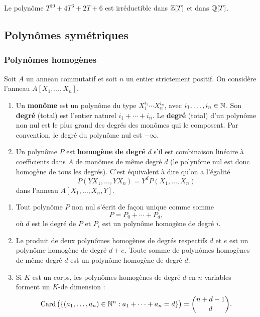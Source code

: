 \documentclass[]{report}
\begin{document}
\begin{ex}{}{}
    Le polynôme $T^{10} + 4T^3 + 2T + 6$ est irréductible dans $\mathbb{Z}[T]$ et dans $\mathbb{Q}[T]$.
\end{ex}

\subsection{Polynômes symétriques}

\subsubsection{Polynômes homogènes}

Soit $A$ un anneau commutatif et soit $n$ un entier strictement positif. On considère l'anneau $A[X_1, \ldots, X_n]$.

\begin{df}{}{}
    \begin{enumerate}
        \item Un \textbf{monôme} est un polynôme du type $X_1^{i_1} \cdots X_n^{i_n}$, avec $i_1, \dots, i_n \in \mathbb{N}$. Son \textbf{degré} (total) est l'entier naturel $i_1 + \cdots + i_n$. Le \textbf{degré} (total) d'un polynôme non nul est le plus grand des degrés des monômes qui le composent. Par convention, le degré du polynôme nul est $-\infty$.
        \item Un polynôme $P$ est \textbf{homogène de degré} $d$ s'il est combinaison linéaire à coefficients dans $A$ de monômes de même degré $d$ (le polynôme nul est donc homogène de tous les degrés). C'est équivalent à dire qu'on a l'égalité
        \[P(YX_1, \dots, YX_n) = Y^d P(X_1, \dots, X_n)\]
        dans l'anneau $A[X_1, \dots, X_n, Y]$.
    \end{enumerate}
\end{df}

\begin{re}{}{}
    \begin{enumerate}
        \item Tout polynôme $P$ non nul s'écrit de façon unique comme somme
        \[P = P_0 + \cdots + P_d,\]
        où $d$ est le degré de $P$ et $P_i$ est un polynôme homogène de degré $i$.
        \item Le produit de deux polynômes homogènes de degrés respectifs $d$ et $e$ est un polynôme homogène de degré $d + e$. Toute somme de polynômes homogènes de même degré $d$ est un polynôme homogène de degré $d$.
        \item Si $K$ est un corps, les polynômes homogènes de degré $d$ en $n$ variables forment un $K$-\ev de dimension :
        \[\operatorname{Card}\big(\{(a_1, \dots, a_n) \in \mathbb{N}^n : a_1 + \cdots + a_n = d\}\big) = \binom{n+d-1}{d}.\]
    \end{enumerate}
\end{re}
\end{document}
